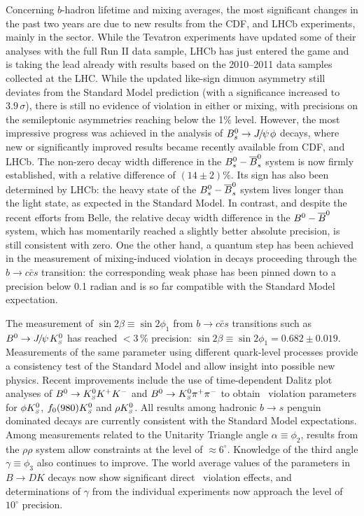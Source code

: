 Concerning $b$-hadron lifetime and mixing averages,
the most significant changes in the past two years
are due to new results from the CDF, \dzero and LHCb experiments, 
mainly in the \Bs sector. While the Tevatron 
experiments have updated some of their analyses with the 
full Run II data sample, LHCb has just entered the game 
and is taking the lead already 
with results based on the 2010--2011 data samples collected 
at the LHC.
While the updated \dzero like-sign dimuon asymmetry 
still deviates from the Standard Model prediction
(with a significance increased to $3.9\,\sigma$), 
there is still no evidence of \CP violation in either 
\Bd or \Bs mixing, with precisions on the semileptonic asymmetries 
reaching below the 1\% level. 
However, the most impressive progress was achieved in the 
analysis of $B^0_s \to{J\mskip -3mu/\mskip -2mu\psi\mskip 2mu}\phi$ decays, 
where new or significantly improved results became recently 
available from CDF, \dzero and LHCb. 
The non-zero decay width difference in the $\Bs-\Bsbar$ system 
is now firmly established, with a relative difference of
$(14\pm2)\%$.
Its sign has also been determined by LHCb: 
the heavy state of the  $\Bs-\Bsbar$ system lives longer 
than the light state, as expected in the Standard Model.
In contrast, and despite the 
recent efforts from Belle, the relative decay width difference in 
the $\Bd-\Bdbar$ system,
which has momentarily reached a slightly better absolute precision,
is still consistent with zero. 
One the other hand, a quantum step
has been achieved in the measurement of 
mixing-induced \CP violation in \Bs decays proceeding through 
the $b\to c\bar{c}s$ transition: the corresponding weak phase 
has been pinned down to a precision below 0.1 radian 
and is so far compatible with the Standard Model expectation.

The measurement of $\sin 2\beta \equiv \sin 2\phi_1$ from $b \to
c\bar{c}s$ transitions such as $B^0 \to {J\mskip -3mu/\mskip -2mu\psi\mskip 2mu}K^0_{\scriptscriptstyle S}$ has reached $<3\,\%$
precision: $\sin 2\beta \equiv \sin 2\phi_1 = 0.682 \pm 0.019$.
Measurements of the same parameter using different quark-level processes
provide a consistency test of the Standard Model and allow insight into
possible new physics.  Recent improvements include the use of
time-dependent Dalitz plot analyses of $B^0 \to K^0_{\scriptscriptstyle S}K^+K^-$ and $B^0 \to
K^0_{\scriptscriptstyle S}\pi^+\pi^-$ to obtain \CP\ violation parameters for $\phi K^0_{\scriptscriptstyle S}$,
$f_0(980)K^0_{\scriptscriptstyle S}$ and $\rho K^0_{\scriptscriptstyle S}$.  All results among hadronic $b \to s$
penguin dominated decays are currently consistent with the Standard
Model expectations.  Among measurements related to the Unitarity
Triangle angle $\alpha \equiv \phi_2$, results from the
$\rho\rho$ system allow constraints at the level of $\approx
6^\circ$.  Knowledge of the third angle $\gamma \equiv \phi_3$ also
continues to improve.  The world average values of
the parameters in $B \to DK$ decays now show significant direct 
\CP\ violation effects, and determinations of $\gamma$ from the individual experiments now approach the level of $10^\circ$ precision.

